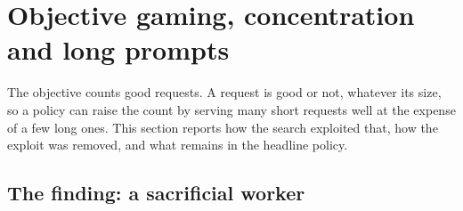 %

\section{Objective gaming, concentration and long prompts}
\label{sec:gaming}

The objective counts good requests. A request is good or not, whatever its size, so a policy can
raise the count by serving many short requests well at the expense of a few long ones. This section
reports how the search exploited that, how the exploit was removed, and what remains in the
headline policy.

\subsection{The finding: a sacrificial worker}
\label{sec:gaming-finding}

